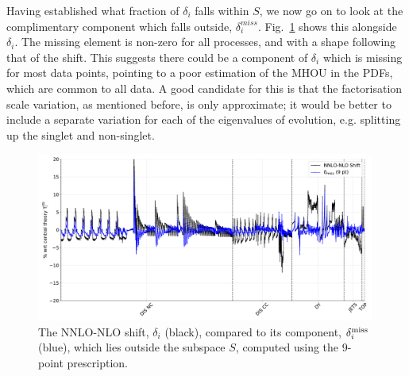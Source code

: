Having established what fraction of $\delta_i$ falls within $S$, we now go on to look at the complimentary component which falls outside, $\delta_i^{miss}$. Fig.~\ref{fig:deltamiss} shows this alongside $\delta_i$. The missing element is non-zero for all processes, and with a shape following that of the shift. This suggests there could be a component of $\delta_i$ which is missing for most data points, pointing to a poor estimation of the MHOU in the PDFs, which are common to all data. A good candidate for this is that the factorisation scale variation, as mentioned before, is only approximate; it would be better to include a separate variation for each of the eigenvalues of evolution, e.g. splitting up the singlet and non-singlet.
\begin{figure}[H]
  \begin{center}
    \includegraphics[width=0.99\textwidth]{mhous/plots/deltamiss_plot.pdf}
    \caption{The NNLO-NLO shift, $\delta_i$ (black), compared to its 
component, $\delta_i^{\rm miss}$ (blue), which lies outside the subspace $S$, computed using the 9-point prescription.}
    \label{fig:deltamiss}
  \end{center}
\end{figure}

